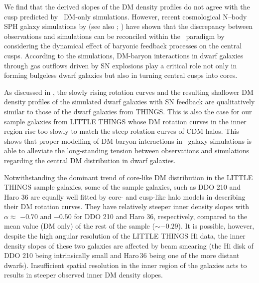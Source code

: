 \documentclass[natbib209]{emulateapj}
\begin{document}
We find that the derived slopes of the DM density profiles do not
agree with the cusp predicted by \LCDM\ DM-only simulations.
However, recent cosmological N--body SPH galaxy simulations by
\cite{Governato_2010} (see also \citeauthor{Governato_2012}
\citeyear{Governato_2012}; \citeauthor{Pontzen_2012} \citeyear{Pontzen_2012})
have shown that the discrepancy between observations and
simulations can be reconciled within the \LCDM\ paradigm by considering the
dynamical effect of baryonic feedback processes on the central cusps. According
to the simulations, DM-baryon interactions in dwarf galaxies through gas outflows
driven by SN explosions play a critical role not only in forming bulgeless dwarf
galaxies but also in turning central cusps into cores. 

As discussed in \cite{Oh_2011b}, the slowly rising rotation curves and the
resulting shallower DM density profiles of the simulated dwarf galaxies
with SN feedback are qualitatively similar to those of the dwarf galaxies from
THINGS. This is also the case for our sample galaxies from LITTLE THINGS whose
DM rotation curves in the inner region rise too slowly to match the steep rotation curves
of CDM halos. This shows that proper modelling of DM-baryon interactions in
\LCDM\ galaxy simulations is able to alleviate the long-standing tension between
observations and simulations regarding the central DM distribution in
dwarf galaxies.

Notwithstanding the dominant trend of core-like DM distribution in the
LITTLE THINGS sample galaxies, some of the sample galaxies, such as DDO 210 and
Haro 36 are equally well fitted by core- and cusp-like halo models in
describing their DM rotation curves. They have relatively steeper inner
density slopes with $\alpha$$\approx$ $-0.70$ and $-0.50$ for DDO 210 and Haro 36, respectively,
compared to the mean value (DM only) of the rest of the sample ($\sim-0.29$). It
is possible, however, despite the high angular resolution of the LITTLE
THINGS H{\sc i} data, the inner density slopes of these two galaxies are
affected by beam smearing (the H{\sc i} disk of DDO 210 being intrinsically
small and Haro\,36 being one of the more distant dwarfs). Insufficient spatial
resolution in the inner region of the galaxies acts to results in steeper
observed inner DM density slopes. 
\end{document}
